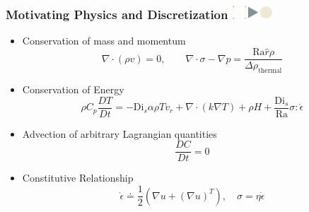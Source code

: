 \documentclass{beamer}
\newcommand\frametitlelogo[1]{\frametitle{#1\hspace{0pt plus 1 filll} \includegraphics[width=42pt]{logo_slides}}}
\begin{document}
\begin{frame}[fragile]
\frametitlelogo{Motivating Physics and Discretization}
\small
\begin{itemize}
\item Conservation of mass and momentum
$$
\nabla \cdot (\rho v) = 0, \quad \quad
\nabla \cdot \sigma - \nabla p = \frac{\text{Ra} \hat r \rho}{\Delta \rho_{\text{thermal}}}
$$
  \item Conservation of Energy
$$
\rho C_p \frac{DT}{Dt} = -\text{Di}_s\alpha \rho T v_r + \nabla \cdot (k \nabla T) + \rho H + \frac{\text{Di}_s}{\text{Ra}} \sigma : \dot \epsilon
$$
\item Advection of arbitrary Lagrangian quantities
$$
\frac{DC}{Dt} = 0
$$
\item Constitutive Relationship
$$
    \dot \epsilon \doteq \frac{1}{2}\left(\nabla u + (\nabla u)^T \right), \quad \sigma = \eta \dot \epsilon
$$
\end{itemize}
\end{frame}
\end{document}
